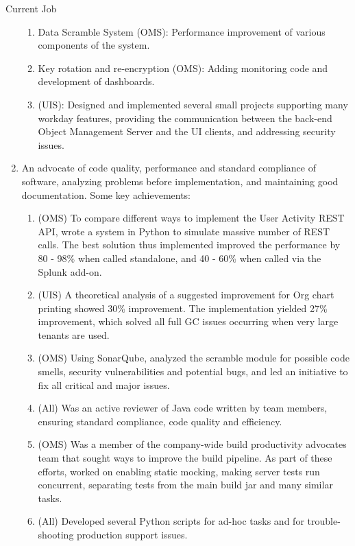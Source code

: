 \documentclass{resume}
\begin{document}
\begin{category}{Current Job}
\begin{enumerate}
\begin{enumerate}
\item Data Scramble System (OMS): Performance improvement of various components of the system.
\item Key rotation and re-encryption (OMS): Adding monitoring code and development of dashboards.
\item (UIS): Designed and implemented several small projects supporting many workday features, providing the communication between the back-end Object Management Server and the UI clients, and addressing security issues.
\end{enumerate}
\item An advocate of code quality, performance and standard compliance of software, analyzing problems before implementation, and maintaining good documentation. Some key achievements:
\begin{enumerate}
\item (OMS) To compare different ways to implement the User Activity REST API, wrote a system in Python to simulate massive number of REST calls.  The best solution thus implemented improved the performance by 80 - 98\% when called standalone, and 40 -
  60\% when called via the Splunk add-on.
\item (UIS) A theoretical analysis of a suggested improvement for Org chart printing showed 30\% improvement.  The implementation yielded 27\% improvement, which solved all full GC issues occurring when very large tenants are used.
\item (OMS) Using SonarQube, analyzed the scramble module for possible code smells, security vulnerabilities and potential bugs, and led an initiative to fix all critical and major issues.
\item (All) Was an active reviewer of Java code written by team members, ensuring standard compliance, code quality and efficiency.
\item (OMS) Was a member of the company-wide build productivity advocates team that sought ways to improve the build pipeline.  As part of these efforts, worked on enabling static mocking, making server tests run concurrent, separating tests from the
  main build jar and many similar tasks.
\item (All) Developed several Python scripts for ad-hoc tasks and for trouble-shooting production support issues.
\end{enumerate}
\end{enumerate}



\end{category}
\end{document}
